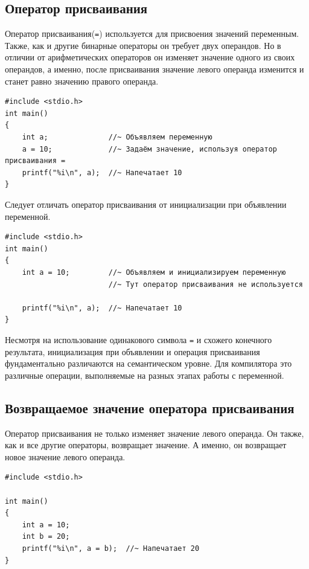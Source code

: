 \documentclass{article}
\begin{document}
\subsection*{Оператор присваивания}
Оператор присваивания(\texttt{=}) используется для присвоения значений переменным. Также, как и другие бинарные операторы он требует двух операндов. Но в отличии от арифметических операторов он изменяет значение одного из своих операндов, а именно, после присваивания значение левого операнда изменится и станет равно значению правого операнда.
\begin{lstlisting}
#include <stdio.h>
int main()
{
	int a;				//~ Объявляем переменную
	a = 10;             //~ Задаём значение, используя оператор присваивания =
	printf("%i\n", a);  //~ Напечатает 10
}
\end{lstlisting}

\noindent Следует отличать оператор присваивания от инициализации при объявлении переменной. 
\begin{lstlisting}
#include <stdio.h>
int main()
{
	int a = 10;			//~ Объявляем и инициализируем переменную
		    			//~ Тут оператор присваивания не используется
	
	printf("%i\n", a);  //~ Напечатает 10
}
\end{lstlisting}
Несмотря на использование одинакового символа \texttt{=} и схожего конечного результата, инициализация при объявлении и операция присваивания фундаментально различаются на семантическом уровне. Для компилятора это различные операции, выполняемые на разных этапах работы с переменной.

\subsection*{Возвращаемое значение оператора присваивания}
Оператор присваивания не только изменяет значение левого операнда. Он также, как и все другие операторы, возвращает значение. А именно, он возвращает новое значение левого операнда.
\begin{lstlisting}
#include <stdio.h>

int main()
{
    int a = 10;
    int b = 20;
    printf("%i\n", a = b);  //~ Напечатает 20
}
\end{lstlisting}
\end{document}
